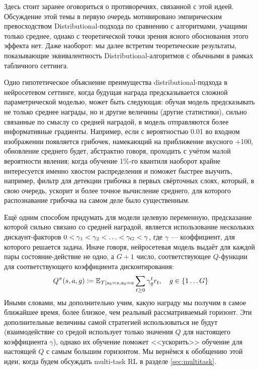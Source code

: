 Здесь стоит заранее оговориться о противоречиях, связанной с этой идеей. Обсуждение этой темы в первую очередь мотивировано эмпирическим превосходством Distributional-подхода по сравнению с алгоритмами, учащими только среднее, однако с теоретической точки зрения ясного обоснования этого эффекта нет. Даже наоборот: мы далее встретим теоретические результаты, показывающие эквивалентность Distributional-алгоритмов с обычными в рамках табличного сеттинга. 

Одно гипотетическое объяснение преимущества distributional-подхода в нейросетевом сеттинге, когда будущая награда предсказывается сложной параметрической моделью, может быть следующая: обучая модель предсказывать не только среднее награды, но и другие величины (другие статистики), сильно связанные по смыслу со средней наградой, в модель отправляются более информативные градиенты. Например, если с вероятностью 0.01 во входном изображении появляется грибочек, намекающий на приближение вкусного +100, обновление среднего будет, абстрактно говоря, проходить с учётом малой вероятности явления; когда обучение 1\%-го квантиля наоборот крайне интересуется именно хвостом распределения и поможет быстрее выучить, например, фильтр для детекции грибочка в первых свёрточных слоях, который, в свою очередь, ускорит и более точное вычисление среднего, для которого распознавание грибочка на самом деле было существенным.

\begin{remark}
Ещё одним способом придумать для модели целевую переменную, предсказание которой сильно связано со средней наградой, является использование нескольких дискаунт-факторов $0 \HM< \gamma_1 \HM< \gamma_2 \HM< \dots \HM< \gamma_G \HM< \gamma$, где $\gamma$ --- коэффициент, для которого решается задача. Иначе говоря, нейросетевая модель выдаёт для каждой пары состояние-действие не одно, а $G+1$ число, соответствующее $Q$-функции для соответствующего коэффициента дисконтирования:
$$Q^\pi(s, a, g) \coloneqq \mathbb{E}_{\mathcal{T} \mid s_0 = s, a_0 = a} \sum_{t \ge 0} \gamma_g^t r_t, \quad g \in \{1 \dots G \}$$
Иными словами, мы дополнительно учим, какую награду мы получим в самое ближайшее время, более близкое, чем реальный рассматриваемый горизонт. Эти дополнительные величины самой стратегией использоваться не будут (взаимодействие со средой использует только значения $Q$ для настоящего коэффициента $\gamma$), однако их обучение поможет <<ускорить>> обучение для настоящей $Q$ с самым большим горизонтом. Мы вернёмся к обобщению этой идеи, когда будем обсуждать multi-task RL в разделе \ref{sec:multitask}.
\end{remark}

